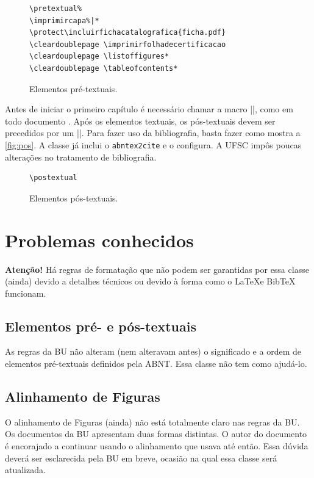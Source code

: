 \documentclass[embeddedlogo]{../ufsc-thesis-rn46-2019}
\begin{document}
\begin{figure}[tb]
  \centering
  \caption{Elementos pré-textuais.}
  \label{fig:pre}
  \begin{verbatim}
\pretextual%
\imprimircapa%|*
\protect\incluirfichacatalografica{ficha.pdf}
\cleardoublepage \imprimirfolhadecertificacao
\cleardouplepage \listoffigures*
\cleardoublepage \tableofcontents*
  \end{verbatim}
\end{figure}

Antes de iniciar o primeiro capítulo é necessário chamar a macro \mt|\textual|,
como em todo documento \abnTeX. Após os elementos textuais, os pós-textuais
devem ser precedidos por um \mt|\postextual|. Para fazer uso da bibliografia,
basta fazer como mostra a \autoref{fig:pos}. A classe já inclui o
\texttt{abntex2cite} e o configura. A UFSC impôs poucas alterações no
tratamento de bibliografia.

\begin{figure}[tb]
  \centering
  \caption{Elementos pós-textuais.}
  \label{fig:pos}
  \begin{verbatim}
\postextual

  \end{verbatim}
\end{figure}


\chapter{Problemas conhecidos}
\label{ch:problems}

\textbf{Atenção!} Há regras de formatação que não podem ser garantidas por essa
classe (ainda) devido a detalhes técnicos ou devido à forma como o \LaTeX e
BibTeX funcionam.

\section{Elementos pré- e pós-textuais}
As regras da BU não alteram (nem alteravam antes) o significado e a ordem de
elementos pré-textuais definidos pela ABNT. Essa classe não tem como ajudá-lo.

\section{Alinhamento de Figuras}
O alinhamento de Figuras (ainda) não está totalmente claro nas regras da BU. Os
documentos da BU apresentam duas formas distintas. O autor do documento é
encorajado a continuar usando o alinhamento que usava até então. Essa dúvida
deverá ser esclarecida pela BU em breve, ocasião na qual essa classe será
atualizada.
\end{document}
